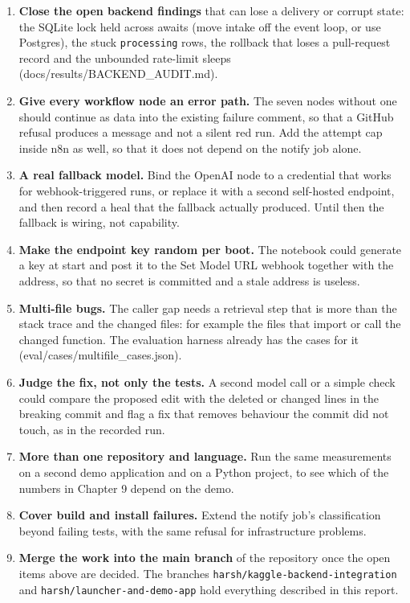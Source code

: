 \documentclass[11pt,a4paper]{report}
\begin{document}
\begin{enumerate}[leftmargin=*,itemsep=2pt]
\item \textbf{Close the open backend findings} that can lose a delivery or corrupt state: the SQLite lock held across awaits (move intake off the event loop, or use Postgres), the stuck \texttt{processing} rows, the rollback that loses a pull-request record and the unbounded rate-limit sleeps (docs/results/BACKEND\_AUDIT.md).
\item \textbf{Give every workflow node an error path.} The seven nodes without one should continue as data into the existing failure comment, so that a GitHub refusal produces a message and not a silent red run. Add the attempt cap inside n8n as well, so that it does not depend on the notify job alone.
\item \textbf{A real fallback model.} Bind the OpenAI node to a credential that works for webhook-triggered runs, or replace it with a second self-hosted endpoint, and then record a heal that the fallback actually produced. Until then the fallback is wiring, not capability.
\item \textbf{Make the endpoint key random per boot.} The notebook could generate a key at start and post it to the Set Model URL webhook together with the address, so that no secret is committed and a stale address is useless.
\item \textbf{Multi-file bugs.} The caller gap needs a retrieval step that is more than the stack trace and the changed files: for example the files that import or call the changed function. The evaluation harness already has the cases for it (eval/cases/multifile\_cases.json).
\item \textbf{Judge the fix, not only the tests.} A second model call or a simple check could compare the proposed edit with the deleted or changed lines in the breaking commit and flag a fix that removes behaviour the commit did not touch, as in the recorded run.
\item \textbf{More than one repository and language.} Run the same measurements on a second demo application and on a Python project, to see which of the numbers in Chapter 9 depend on the demo.
\item \textbf{Cover build and install failures.} Extend the notify job's classification beyond failing tests, with the same refusal for infrastructure problems.
\item \textbf{Merge the work into the main branch} of the repository once the open items above are decided. The branches \texttt{harsh/\allowbreak{}kaggle-\allowbreak{}backend-\allowbreak{}integration} and \texttt{harsh/\allowbreak{}launcher-\allowbreak{}and-\allowbreak{}demo-\allowbreak{}app} hold everything described in this report.
\end{enumerate}
\end{document}
